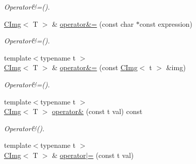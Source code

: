 \begin{DoxyCompactItemize}
\begin{DoxyCompactList}\small\item\em Operator\&=(). \item\end{DoxyCompactList}\item 
\hypertarget{structcimg__library_1_1CImg_ad87b0eb615d6a211c71f955f9e572e42}{
\hyperlink{structcimg__library_1_1CImg}{CImg}$<$ T $>$ \& \hyperlink{structcimg__library_1_1CImg_ad87b0eb615d6a211c71f955f9e572e42}{operator\&=} (const char $\ast$const expression)}
\label{structcimg__library_1_1CImg_ad87b0eb615d6a211c71f955f9e572e42}

\begin{DoxyCompactList}\small\item\em Operator\&=(). \item\end{DoxyCompactList}\item 
\hypertarget{structcimg__library_1_1CImg_a788c26161bb12c4fed30b2a8edf05126}{
{\footnotesize template$<$typename t $>$ }\\\hyperlink{structcimg__library_1_1CImg}{CImg}$<$ T $>$ \& \hyperlink{structcimg__library_1_1CImg_a788c26161bb12c4fed30b2a8edf05126}{operator\&=} (const \hyperlink{structcimg__library_1_1CImg}{CImg}$<$ t $>$ \&img)}
\label{structcimg__library_1_1CImg_a788c26161bb12c4fed30b2a8edf05126}

\begin{DoxyCompactList}\small\item\em Operator\&=(). \item\end{DoxyCompactList}\item 
\hypertarget{structcimg__library_1_1CImg_a9f371e875a0bdfbdb2e5b2b55a44e2a6}{
{\footnotesize template$<$typename t $>$ }\\\hyperlink{structcimg__library_1_1CImg}{CImg}$<$ T $>$ \hyperlink{structcimg__library_1_1CImg_a9f371e875a0bdfbdb2e5b2b55a44e2a6}{operator\&} (const t val) const }
\label{structcimg__library_1_1CImg_a9f371e875a0bdfbdb2e5b2b55a44e2a6}

\begin{DoxyCompactList}\small\item\em Operator\&(). \item\end{DoxyCompactList}\item 
\hypertarget{structcimg__library_1_1CImg_a57ebbd057a44b4c5b93c63824a84d161}{
{\footnotesize template$<$typename t $>$ }\\\hyperlink{structcimg__library_1_1CImg}{CImg}$<$ T $>$ \& \hyperlink{structcimg__library_1_1CImg_a57ebbd057a44b4c5b93c63824a84d161}{operator$|$=} (const t val)}
\label{structcimg__library_1_1CImg_a57ebbd057a44b4c5b93c63824a84d161}


\end{DoxyCompactItemize}
